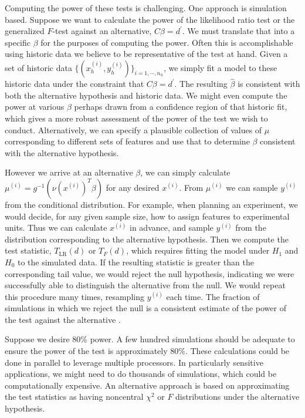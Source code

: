 \documentclass[12pt]{article}
\begin{document}
Computing the power of these tests is challenging. One approach is simulation based. Suppose we want to calculate the power of the likelihood ratio test or  the generalized $F$-test against an alternative, $C \beta = d^\prime$. We must translate that into a specific $\beta$ for the purposes of computing the power. Often this is accomplishable using historic data we believe to be representative of the test at hand. Given a set of historic data $\{ (x_h^{(i)}, y_h^{(i)}) \}_{i=1, \cdots, n_h}$, we simply fit a model to these historic data under the constraint that $C \beta = d^\prime$. The resulting $\hat{\beta}$ is consistent with both the alternative hypothesis and historic data. We might even compute the power at various $\beta$ perhaps drawn from a confidence region of that historic fit, which gives a more robust assessment of the power of the test we wish to conduct. Alternatively, we can specify a plausible collection of values of $\mu$ corresponding to different sets of features and use that to determine $\beta$ consistent with the alternative hypothesis.

However we arrive at an alternative $\beta$, we can simply calculate $\mu^{(i)} = g^{-1}(\nu(x^{(i)})^T \beta)$ for any desired $x^{(i)}$. From $\mu^{(i)}$ we can sample $y^{(i)}$ from the conditional distribution. For example, when planning an experiment, we would decide, for any given sample size, how to assign features to experimental units. Thus we can calculate $x^{(i)}$ in advance, and sample $y^{(i)}$ from the distribution corresponding to the alternative hypothesis. Then we compute the test statistic, $T_{\textrm{LR}}(d)$ or $T_F(d)$, which requires fitting the model under $H_1$ and $H_0$ to the simulated data. If the resulting statistic is greater than the corresponding tail value, we would reject the null hypothesis, indicating we were successfully able to distinguish the alternative from the null. We would repeat this procedure many times, resampling $y^{(i)}$  each time. The fraction of simulations in which we reject the null is a consistent estimate of the power of the test against the alternative \cite{JBFM:15}. 

Suppose we desire $80\%$ power. A few hundred simulations should be adequate to ensure the power of the test is approximately $80\%$. These calculations could be done in parallel to leverage multiple processors. In particularly sensitive applications, we might need to do thousands of simulations, which could be computationally expensive. An alternative approach is based on approximating the test statistics as having noncentral $\chi^2$ or $F$ distributions under the alternative hypothesis. 
\end{document}
